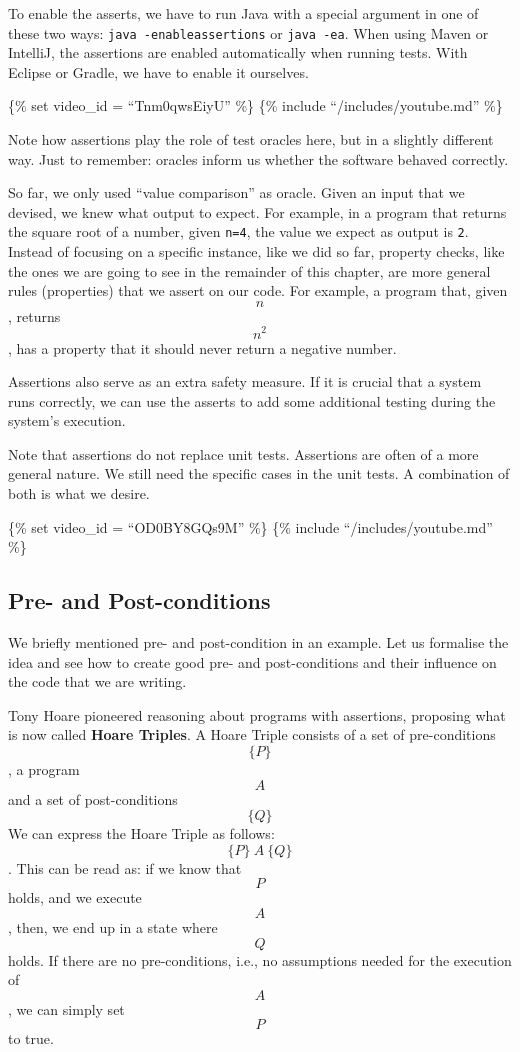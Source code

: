 To enable the asserts, we have to run Java with a special argument in
one of these two ways: \texttt{java\ -enableassertions} or
\texttt{java\ -ea}. When using Maven or IntelliJ, the assertions are
enabled automatically when running tests. With Eclipse or Gradle, we
have to enable it ourselves.

\{\% set video\_id = ``Tnm0qwsEiyU'' \%\} \{\% include
``/includes/youtube.md'' \%\}

Note how assertions play the role of test oracles here, but in a
slightly different way. Just to remember: oracles inform us whether the
software behaved correctly.

So far, we only used ``value comparison'' as oracle. Given an input that
we devised, we knew what output to expect. For example, in a program
that returns the square root of a number, given \texttt{n=4}, the value
we expect as output is \texttt{2}. Instead of focusing on a specific
instance, like we did so far, property checks, like the ones we are
going to see in the remainder of this chapter, are more general rules
(properties) that we assert on our code. For example, a program that,
given \[n\], returns \[n^2\], has a property that it should never return
a negative number.

Assertions also serve as an extra safety measure. If it is crucial that
a system runs correctly, we can use the asserts to add some additional
testing during the system's execution.

Note that assertions do not replace unit tests. Assertions are often of
a more general nature. We still need the specific cases in the unit
tests. A combination of both is what we desire.

\{\% set video\_id = ``OD0BY8GQs9M'' \%\} \{\% include
``/includes/youtube.md'' \%\}

\hypertarget{pre--and-post-conditions}{%
\subsection{Pre- and Post-conditions}\label{pre--and-post-conditions}}

We briefly mentioned pre- and post-condition in an example. Let us
formalise the idea and see how to create good pre- and post-conditions
and their influence on the code that we are writing.

Tony Hoare pioneered reasoning about programs with assertions, proposing
what is now called \textbf{Hoare Triples}. A Hoare Triple consists of a
set of pre-conditions \[\{ P \}\], a program \[A\] and a set of
post-conditions \[\{ Q \}\] We can express the Hoare Triple as follows:
\[\{ P \}\ A\ \{ Q \}\]. This can be read as: if we know that \[P\]
holds, and we execute \[A\], then, we end up in a state where \[Q\]
holds. If there are no pre-conditions, i.e., no assumptions needed for
the execution of \[A\], we can simply set \[P\] to true.

